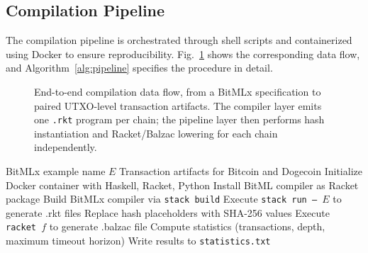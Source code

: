 \documentclass[journal]{IEEEtran}
\begin{document}
\subsection{Compilation Pipeline}

The compilation pipeline is orchestrated through shell scripts and containerized using Docker to ensure reproducibility. Fig.~\ref{fig:pipeline} shows the corresponding data flow, and Algorithm~\ref{alg:pipeline} specifies the procedure in detail.

\begin{figure}[t]
\centering
{}
\caption{End-to-end compilation data flow, from a BitMLx specification to paired UTXO-level transaction artifacts. The compiler layer emits one \texttt{.rkt} program per chain; the pipeline layer then performs hash instantiation and Racket/Balzac lowering for each chain independently.}
\label{fig:pipeline}
\end{figure}

\begin{algorithm}[t]
\caption{BitMLx Compilation Pipeline}
\label{alg:pipeline}
\begin{algorithmic}[1]
\REQUIRE BitMLx example name $E$
\ENSURE Transaction artifacts for Bitcoin and Dogecoin
\STATE Initialize Docker container with Haskell, Racket, Python
\STATE Install BitML compiler as Racket package
\STATE Build BitMLx compiler via \texttt{stack build}
\STATE Execute \texttt{stack run -- $E$} to generate .rkt files
    \STATE Replace hash placeholders with SHA-256 values
    \STATE Execute \texttt{racket $f$} to generate .balzac file
\ENDFOR
\STATE Compute statistics (transactions, depth, maximum timeout horizon)
\STATE Write results to \texttt{statistics.txt}
\end{algorithmic}
\end{algorithm}
\end{document}
